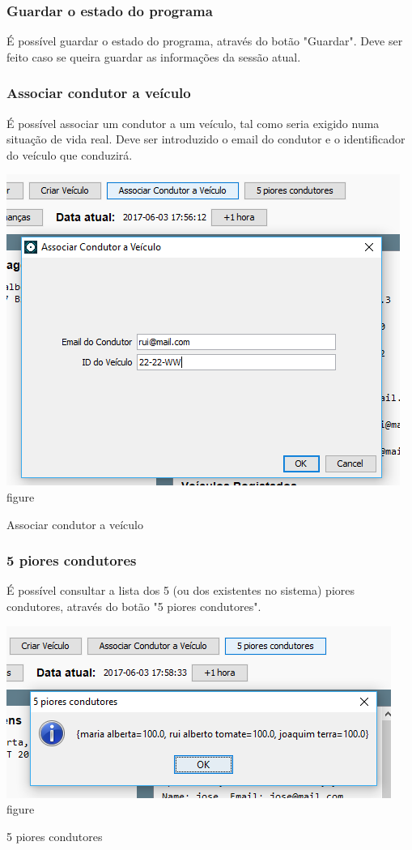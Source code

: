 \documentclass[a4paper]{article}
\begin{document}
\subsubsection{Guardar o estado do programa}
É possível guardar o estado do programa, através do botão "Guardar". Deve ser feito caso se queira guardar as informações da sessão atual.
\subsubsection{Associar condutor a veículo}
É possível associar um condutor a um veículo, tal como seria exigido numa situação de vida real. Deve ser introduzido o email do condutor e o identificador do veículo que conduzirá.
\begin{center}
  \includegraphics[scale=0.75]{outras_associar}\\
  \caption{figure}{Associar condutor a veículo}
  \label{fig:picture}
\end{center}
\subsubsection{5 piores condutores}
É possível consultar a lista dos 5 (ou dos existentes no sistema) piores condutores, através do botão "5 piores condutores".
\begin{center}
  \includegraphics[scale=0.75]{outras_5piores}\\
  \caption{figure}{5 piores condutores}
  \label{fig:picture}
\end{center}
\end{document}
